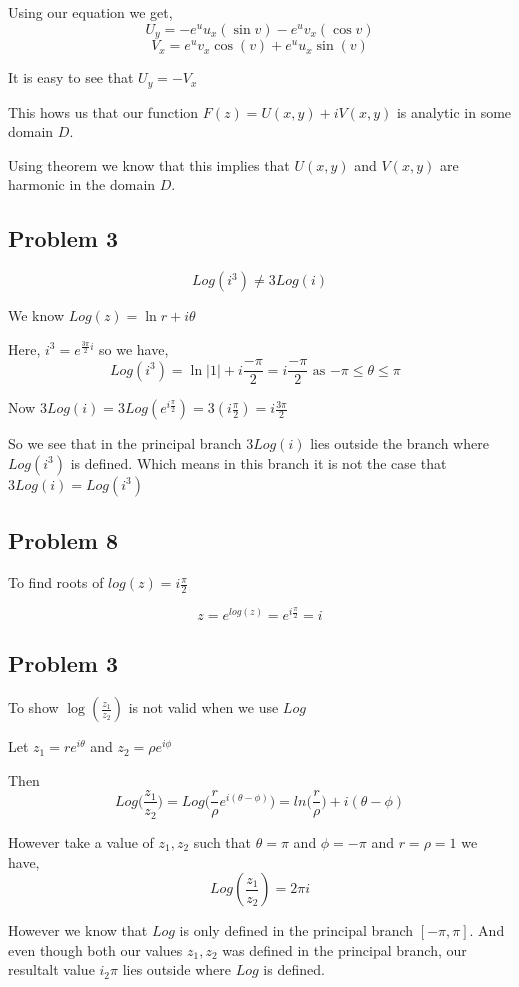 \documentclass[a4paper]{report}
\begin{document}
Using our equation we get, $$ U_y = - e^u u_x(\sin v)  -e^u v_x (\cos v)$$  
$$ V_x = e^u v_x \cos (v) + e^u u_x \sin(v) $$ 

It is easy to see that $U_y = -V_x$

This hows us that our function $F(z) = U(x,y) + iV(x,y)$ is analytic in some domain  $D$.

Using theorem we know that this implies that  $U(x,y)$ and  $V(x,y)$ are harmonic in the domain  $D$.

 \subsection*{Problem 3}
 $$Log(i^3) \ne 3 Log(i)$$

 We know $Log(z) = \ln r + i \theta$

 Here, $i^3 = e^{\frac{3\pi}{2} i}$ so we have, 
 $$ Log(i^3) = \ln|1| + i {\frac{-\pi}{2}} = i \frac{-\pi}{2} \text{ as $-\pi \le \theta \le \pi$ }$$ 

 Now $3 Log(i) = 3 Log(e^{i\frac{\pi}{2}}) = 3 (i\frac{\pi}{2}) = i \frac{3\pi}{2}$ 

 So we see that in the principal branch $3 Log(i)$ lies outside the branch where  $Log(i^3)$ is defined. Which means in this branch it is not the case that $3 Log(i) = Log(i^3)$


 \subsection*{Problem 8}
 To find roots of $log(z) = i \frac{\pi}{2}$ 

 
 $$ z = e^{log(z)} = e^{i \frac{\pi}{2}} = i$$ 

 \subsection*{Problem 3}
 To show  $ \log(\frac{z_1}{z_2})  $ is not valid when we use $Log$

 Let $z_1 = re^{i\theta}$   and $z_2 = \rho e^{i \phi}$

 Then  
 $$ Log\bigg(\frac{z_1}{z_2}\bigg) = Log \bigg (\frac{r}{\rho} e^{i(\theta - \phi)}\bigg) =  ln\bigg(\frac{r}{\rho}\bigg) + i(\theta - \phi)$$ 

 However take a value of $z_1,z_2$ such that $\theta = \pi$ and $\phi = -\pi$ and $r = \rho = 1$ we have,  
 $$ Log(\frac{z_1}{z_2}) = 2\pi i$$ 

 However we know that $Log$ is only defined in the principal branch  $[-\pi, \pi]$. And even though both our values  $z_1, z_2$ was defined in the principal branch, our resultalt value $i_2\pi$ lies outside where $Log$ is defined.
\end{document}
